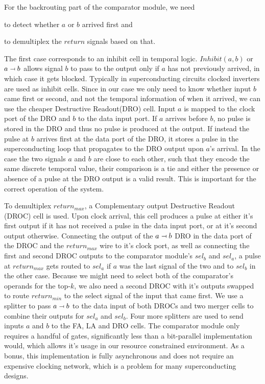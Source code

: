 \documentclass[conference]{IEEEtran}
\newcommand{\inhib}{\relbar\mapsfromchar}
\begin{document}
For the backrouting part of the comparator module, we need
\begin{enumerate*}[label=\emph{\alph*})] \item to detect
    whether $a$ or $b$ arrived first and \item to
      demultiplex the $return$ signals based on that.
\end{enumerate*} The first case corresponds to an inhibit
cell in temporal logic. $Inhibit(a,b)$ or $a \inhib b$
allows signal $b$ to pass to the output only if $a$ has not
previously arrived, in which case it gets blocked. Typically
in superconducting circuits clocked inverters are used as
inhibit cells. Since in our case we only need to know
whether input $b$ came first or second, and not the temporal
information of when it arrived, we can use the cheaper
Destructive Readout(DRO) cell. Input $a$ is mapped to the
clock port of the DRO and $b$ to the data input port. If $a$
arrives before $b$, no pulse is stored in the DRO and thus
no pulse is produced at the output. If instead the pulse at
$b$ arrives first at the data port of the DRO, it stores a
pulse in the superconducting loop that propagates to the DRO
output upon $a$'s arrival. In the case the two signals $a$
and $b$ are close to each other, such that they encode the
same discrete temporal value, their comparison is a tie and
either the presence or absence of a pulse at the DRO output
is a valid result. This is important for the correct
operation of the system.

To demultiplex $return_{max}$, a Complementary output
Destructive Readout (DROC) cell is used. Upon clock arrival,
this cell produces a pulse at either it's first output if it
has not received a pulse in the data input port, or at it's
second output otherwise. Connecting the output of the $a
\inhib b$ DRO in the data port of the DROC and the
$return_{max}$ wire to it's clock port, as well as
connecting the first and second DROC outputs to the
comparator module's $sel_b$ and $sel_a$, a pulse at
$return_{max}$ gets routed to $sel_a$ if $a$ was the last
signal of the two and to $sel_b$ in the other case. Because
we might need to select both of the comparator's operands
for the top-$k$, we also need a second DROC with it's
outputs swapped to route $return_{min}$ to the select signal
of the input that came first. We use a splitter to pass $a
\inhib b$ to the data input of both DROCs and two merger
cells to combine their outputs for $sel_a$ and $sel_b$. Four
more splitters are used to send inputs $a$ and $b$ to the
FA, LA and DRO cells. The comparator module only requires a
handful of gates, significantly less than a bit-parallel
implementation would, which allows it's usage in our
resource constrained environment. As a bonus, this implementation
is fully asynchronous and does not require an expensive clocking network,
which is a problem for many superconducting designs.
\end{document}
